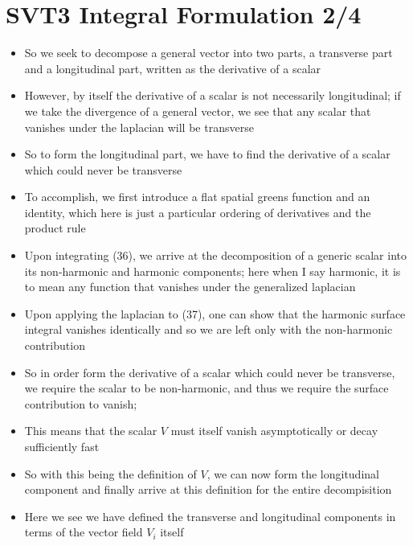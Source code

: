 \documentclass[10pt,letterpaper]{article}
\numberwithin{equation}{section}
\begin{document}
\section{SVT3 Integral Formulation 2/4}
\begin{itemize}
	\item So we seek to decompose a general vector into two parts, a transverse part and a longitudinal part, written as the derivative of a scalar
	\item However, by itself the derivative of a scalar is not necessarily longitudinal; if we take the divergence of a general vector, we see that any scalar that vanishes under the laplacian will be transverse
	\item So to form the longitudinal part, we have to find the derivative of a scalar which could never be transverse
	\item To accomplish, we first introduce a flat spatial greens function and an identity, which here is just a particular ordering of derivatives and the product rule
	\item Upon integrating (36), we arrive at the decomposition of a generic scalar into its non-harmonic and harmonic components; here when I say harmonic, it is to mean any function that vanishes under the generalized laplacian
	\item Upon applying the laplacian to (37), one can show that the harmonic surface integral vanishes identically and so we are left only with the non-harmonic contribution
	\item So in order form the derivative of a scalar which could never be transverse, we require the scalar to be non-harmonic, and thus we require the surface contribution to vanish; 
	\item This means that the scalar $V$ must itself vanish asymptotically or decay sufficiently fast
	\item So with this being the definition of $V$, we can now form the longitudinal component and finally arrive at this definition for the entire decompisition
	\item Here we see we have defined the transverse and longitudinal components in terms of the vector field $V_i$ itself
\end{itemize}

\end{document}
